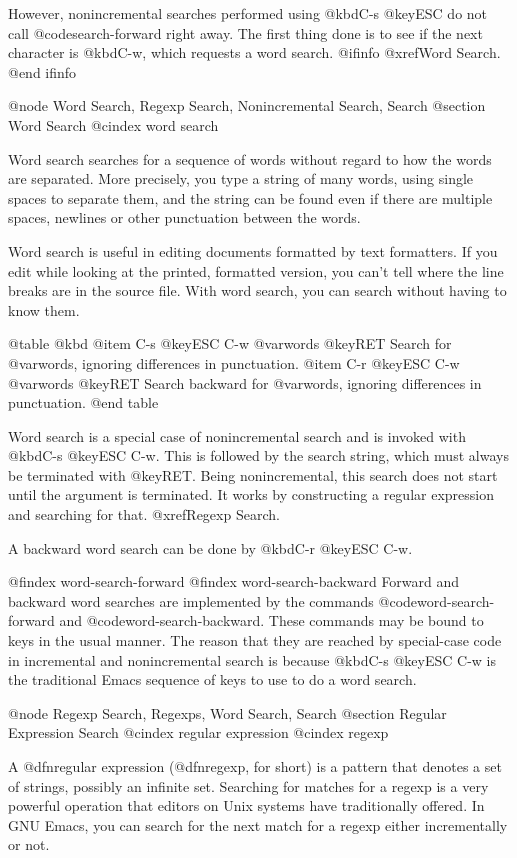 {{{{{{{  However, nonincremental searches performed using @kbd{C-s @key{ESC}} do
not call @code{search-forward} right away.  The first thing done is to see
if the next character is @kbd{C-w}, which requests a word search.
@ifinfo
@xref{Word Search}.
@end ifinfo

@node Word Search, Regexp Search, Nonincremental Search, Search
@section Word Search
@cindex word search

  Word search searches for a sequence of words without regard to how the
words are separated.  More precisely, you type a string of many words,
using single spaces to separate them, and the string can be found even if
there are multiple spaces, newlines or other punctuation between the words.

  Word search is useful in editing documents formatted by text formatters.
If you edit while looking at the printed, formatted version, you can't tell
where the line breaks are in the source file.  With word search, you can
search without having to know them.

@table @kbd
@item C-s @key{ESC} C-w @var{words} @key{RET}
Search for @var{words}, ignoring differences in punctuation.
@item C-r @key{ESC} C-w @var{words} @key{RET}
Search backward for @var{words}, ignoring differences in punctuation.
@end table

  Word search is a special case of nonincremental search and is invoked
with @kbd{C-s @key{ESC} C-w}.  This is followed by the search string, which
must always be terminated with @key{RET}.  Being nonincremental, this
search does not start until the argument is terminated.  It works by
constructing a regular expression and searching for that.  @xref{Regexp
Search}.

  A backward word search can be done by @kbd{C-r @key{ESC} C-w}.

@findex word-search-forward
@findex word-search-backward
  Forward and backward word searches are implemented by the commands
@code{word-search-forward} and @code{word-search-backward}.  These commands
may be bound to keys in the usual manner.  The reason that they are reached
by special-case code in incremental and nonincremental search is because
@kbd{C-s @key{ESC} C-w} is the traditional Emacs sequence of keys to use to
do a word search.

@node Regexp Search, Regexps, Word Search, Search
@section Regular Expression Search
@cindex regular expression
@cindex regexp

  A @dfn{regular expression} (@dfn{regexp}, for short) is a pattern that
denotes a set of strings, possibly an infinite set.  Searching for matches
for a regexp is a very powerful operation that editors on Unix systems have
traditionally offered.  In GNU Emacs, you can search for the next match for
a regexp either incrementally or not.

}}}}}}}

